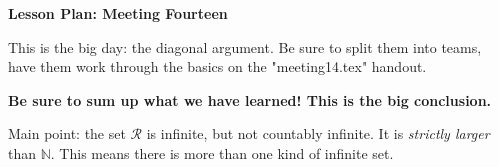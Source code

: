 \documentclass[12pt]{amsart}
\theoremstyle{definition}
\begin{document}
\begin{center}
\textbf{\Huge
Lesson Plan: Meeting Fourteen
}
\end{center}
\vspace{.5in}

This is the big day: the diagonal argument. 
Be sure to split them into teams, have them work through the basics on the "meeting14.tex" handout.

\textbf{Be sure to sum up what we have learned!
This is the big conclusion.}

Main point: the set $\mathcal{R}$ is infinite, but not countably infinite. 
It is \emph{strictly larger} than $\mathbb{N}$. 
This means there is more than one kind of infinite set.
\end{document}
